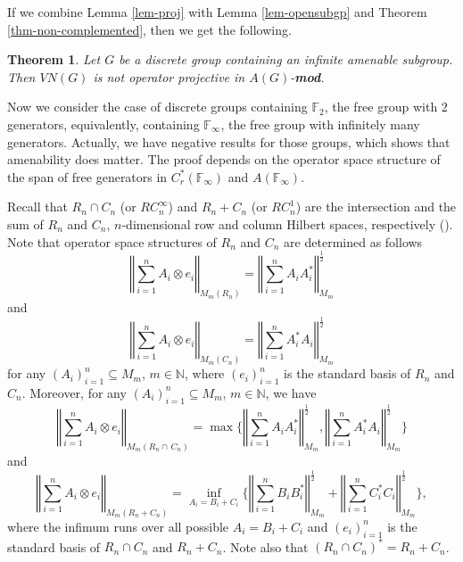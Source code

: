\documentclass[10pt]{amsart}
\newtheorem{thm}{Theorem}
\numberwithin{thm}{section}
\numberwithin{equation}{section}
\begin{document}
If we combine Lemma \ref{lem-proj} with Lemma \ref{lem-opensubgp} and Theorem \ref{thm-non-complemented}, then we get the following.

	\begin{thm}\label{thm-VN(G)}
	Let $G$ be a discrete group containing an infinite amenable subgroup.
	Then $VN(G)$ is not operator projective in $A(G)$-{\bf mod}.
	\end{thm}

Now we consider the case of discrete groups containing $\mathbb{F}_2$, the free group with 2 generators,
equivalently, containing $\mathbb{F}_\infty$, the free group with infinitely many generators.
Actually, we have negative results for those groups, which shows that amenability does matter.
The proof depends on the operator space structure of the span of free generators in $C^*_r(\mathbb{F}_\infty)$ and $A(\mathbb{F}_\infty)$.

Recall that $R_n \cap C_n$ (or $RC^\infty_n$) and $R_n + C_n$ (or $RC^1_n$) are the intersection and the sum of $R_n$ and $C_n$,
$n$-dimensional row and column Hilbert spaces, respectively (\cite{P03}).
Note that operator space structures of $R_n$ and $C_n$ are determined as follows
	$${\left\Vert{\sum^n_{i=1}A_i \otimes e_i}\right\Vert}_{M_m(R_n)} = {\left\Vert{\sum^n_{i=1}A_iA^*_i}\right\Vert}_{M_m}^{\frac{1}{2}}$$
and
	$${\left\Vert{\sum^n_{i=1}A_i \otimes e_i}\right\Vert}_{M_m(C_n)} = {\left\Vert{\sum^n_{i=1}A^*_iA_i}\right\Vert}_{M_m}^{\frac{1}{2}}$$
for any $(A_i)^n_{i=1} \subseteq M_m$, $m\in {\mathbb{N}}$, where $(e_i)^n_{i=1}$ is the standard basis of $R_n$ and $C_n$.
Moreover, for any $(A_i)^n_{i=1} \subseteq M_m$, $m\in {\mathbb{N}}$, we have
	$${\left\Vert{\sum^n_{i=1}A_i \otimes e_i}\right\Vert}_{M_m(R_n\cap\, C_n)}
	= \max \Bigg\{ {\left\Vert{\sum^n_{i=1}A_iA^*_i}\right\Vert}_{M_m}^{\frac{1}{2}}, {\left\Vert{\sum^n_{i=1}A^*_iA_i}\right\Vert}_{M_m}^{\frac{1}{2}} \Bigg\}$$
and 
	$${\left\Vert{\sum^n_{i=1}A_i \otimes e_i}\right\Vert}_{M_m(R_n +C_n)}
	= \inf_{A_i = B_i + C_i} \Bigg\{ {\left\Vert{\sum^n_{i=1}B_iB^*_i}\right\Vert}_{M_m}^{\frac{1}{2}}+ {\left\Vert{\sum^n_{i=1}C^*_iC_i}\right\Vert}_{M_m}^{\frac{1}{2}} \Bigg\},$$
where the infimum runs over all possible $A_i = B_i + C_i$ and $(e_i)^n_{i=1}$ is the standard basis of $R_n \cap C_n$ and $R_n +C_n$.
Note also that $(R_n\cap C_n)^* = R_n +C_n$.
\end{document}
